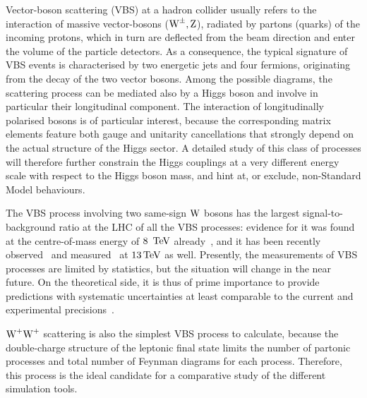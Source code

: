Vector-boson scattering (VBS) at a hadron collider 
usually refers to the interaction of massive vector-bosons ($\text{W}^\pm,\text{Z}$),
radiated by partons (quarks) of the incoming protons, 
which in turn are deflected from the beam direction 
and enter the volume of the particle detectors.
As a consequence, the typical signature of VBS events
is characterised by two energetic jets 
and four fermions,
originating from the decay of the two vector bosons.
Among the possible diagrams,
the scattering process can be mediated also by a Higgs boson
and involve in particular their longitudinal component.
The interaction of longitudinally polarised bosons is of particular interest, 
because the corresponding matrix elements feature both gauge and unitarity cancellations 
that strongly depend on the actual structure of the Higgs sector.
A detailed study of this class of processes will therefore further constrain the Higgs couplings 
at a very different energy scale with respect to the Higgs boson mass,
and hint at, or exclude, non-Standard Model behaviours.

The VBS process involving two same-sign $\text{W}$ bosons has the largest signal-to-background ratio at the LHC of all the VBS processes:
evidence for it was found at the centre-of-mass energy of $8~\,\text{TeV}$ already~\cite{Aad:2014zda,Khachatryan:2014sta},
and it has been recently observed~\cite{Sirunyan:2017ret} and measured~\cite{Aaboud:2016ffv} 
at $13\,\text{TeV}$ as well.
Presently, the measurements of VBS processes are limited by statistics, but the situation will change in the near future.
On the theoretical side, 
it is thus of prime importance to provide predictions with systematic uncertainties
at least comparable to the current and experimental precisions~\cite{CMS:2016rcn}.


$\text{W}^+\text{W}^+$ scattering is also the simplest VBS process to calculate, 
because the double-charge structure of the leptonic final state 
limits the number of partonic processes and total number of Feynman diagrams for each process.
Therefore, this process is the ideal candidate for a comparative study of the different simulation tools. 

